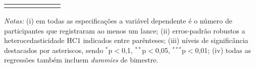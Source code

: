 \begin{table}[!htbp]
\begin{threeparttable}
\begin{tabular}{lcccccc}
\hline \\[-1.8ex] 
\end{tabular}
\begin{tablenotes}
\footnotesize
\emph{Notas:} (i) em todas as especificações a variável dependente é o número de participantes que registraram ao menos um lance; (ii) erros-padrão robustos a heterocedasticidade HC1 indicados entre parênteses; (iii) níveis de significância destacados por asteriscos, sendo  $^{*}$p$<$0,1, $^{**}$p$<$0,05, $^{***}$p$<$0,01; (iv) todas as regressões também incluem \textit{dummies} de bimestre.\\ 
\end{tablenotes}
\end{threeparttable}
\end{table}
